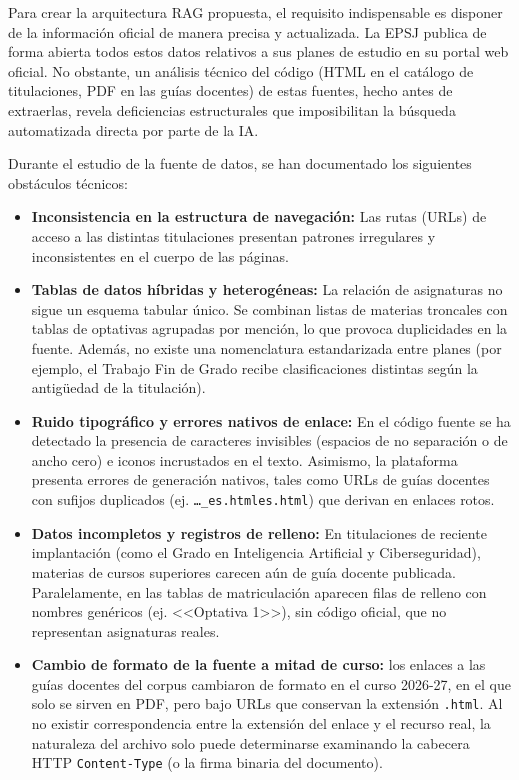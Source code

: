Para crear la arquitectura RAG propuesta, el requisito indispensable es disponer de la información oficial de manera precisa y actualizada. La EPSJ publica de forma abierta todos estos datos relativos a sus planes de estudio en su portal web oficial\cite{epsj_grados}. No obstante, un análisis técnico del código (HTML en el catálogo de titulaciones, PDF en las guías docentes) de estas fuentes, hecho antes de extraerlas, revela deficiencias estructurales que imposibilitan la búsqueda automatizada directa por parte de la IA.

Durante el estudio de la fuente de datos, se han documentado los siguientes obstáculos técnicos:

\begin{itemize}
  \item \textbf{Inconsistencia en la estructura de navegación:} Las rutas (URLs) de acceso a las distintas titulaciones presentan patrones irregulares y  inconsistentes en el cuerpo de las páginas.
  \item \textbf{Tablas de datos híbridas y heterogéneas:} La relación de asignaturas no sigue un esquema tabular único. Se combinan listas de materias troncales con tablas de optativas agrupadas por mención, lo que provoca duplicidades en la fuente. Además, no existe una nomenclatura estandarizada entre planes (por ejemplo, el Trabajo Fin de Grado recibe clasificaciones distintas según la antigüedad de la titulación).
  \item \textbf{Ruido tipográfico y errores nativos de enlace:} En el código fuente se ha detectado la presencia de caracteres invisibles (espacios de no separación o de ancho cero) e iconos incrustados en el texto. Asimismo, la plataforma presenta errores de generación nativos, tales como URLs de guías docentes con sufijos duplicados (ej. \texttt{\dots\_es.htmles.html}) que derivan en enlaces rotos.
  \item \textbf{Datos incompletos y registros de relleno:} En titulaciones de reciente implantación (como el Grado en Inteligencia Artificial y Ciberseguridad), materias de cursos superiores carecen aún de guía docente publicada. Paralelamente, en las tablas de matriculación aparecen filas de relleno con nombres genéricos (ej. <<Optativa 1>>), sin código oficial, que no representan asignaturas reales.
  \item \textbf{Cambio de formato de la fuente a mitad de curso:} los enlaces a las guías docentes del corpus cambiaron de formato en el curso 2026-27, en el que solo se sirven en PDF, pero bajo URLs que conservan la extensión \texttt{.html}. Al no existir correspondencia entre la extensión del enlace y el recurso real, la naturaleza del archivo solo puede determinarse examinando la cabecera HTTP \texttt{Content-Type} (o la firma binaria del documento). 
\end{itemize}


